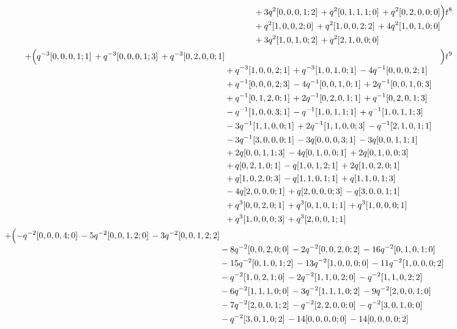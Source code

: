 \documentclass[10pt]{article}
\begin{document}
\[\begin{aligned}
\begin{aligned}[t]
  &{}+3q^{2}[0,0,0,1;2]\,+q^{2}[0,1,1,1;0]\,+q^{2}[0,2,0,0;0] \\
  &{}+q^{2}[1,0,0,2;0]\,+q^{2}[1,0,0,2;2]\,+4q^{2}[1,0,1,0;0] \\
  &{}+3q^{2}[1,0,1,0;2]\,+q^{2}[2,1,0,0;0]\end{aligned}\Bigr)t^{8} \\
  + \Bigl(\begin{aligned}[t]q^{-3}[0,0,0,1;1]\,+q^{-3}[0,0,0,1;3]\,+q^{-3}[0,2,0,0;1] \\
  &{}+q^{-3}[1,0,0,2;1]\,+q^{-3}[1,0,1,0;1]\,-4q^{-1}[0,0,0,2;1] \\
  &{}+q^{-1}[0,0,0,2;3]\,-4q^{-1}[0,0,1,0;1]\,+2q^{-1}[0,0,1,0;3] \\
  &{}+q^{-1}[0,1,2,0;1]\,+2q^{-1}[0,2,0,1;1]\,+q^{-1}[0,2,0,1;3] \\
  &{}-q^{-1}[1,0,0,3;1]\,-q^{-1}[1,0,1,1;1]\,+q^{-1}[1,0,1,1;3] \\
  &{}-3q^{-1}[1,1,0,0;1]\,+2q^{-1}[1,1,0,0;3]\,-q^{-1}[2,1,0,1;1] \\
  &{}-3q^{-1}[3,0,0,0;1]\,-3q[0,0,0,3;1]\,-3q[0,0,1,1;1] \\
  &{}+2q[0,0,1,1;3]\,-4q[0,1,0,0;1]\,+2q[0,1,0,0;3] \\
  &{}+q[0,2,1,0;1]\,-q[1,0,1,2;1]\,+2q[1,0,2,0;1] \\
  &{}+q[1,0,2,0;3]\,-q[1,1,0,1;1]\,+q[1,1,0,1;3] \\
  &{}-4q[2,0,0,0;1]\,+q[2,0,0,0;3]\,-q[3,0,0,1;1] \\
  &{}+q^{3}[0,0,2,0;1]\,+q^{3}[0,1,0,1;1]\,+q^{3}[1,0,0,0;1] \\
  &{}+q^{3}[1,0,0,0;3]\,+q^{3}[2,0,0,1;1]\end{aligned}\Bigr)t^{9} \\
  + \Bigl(\begin{aligned}[t]-q^{-2}[0,0,0,4;0]\,-5q^{-2}[0,0,1,2;0]\,-3q^{-2}[0,0,1,2;2] \\
  &{}-8q^{-2}[0,0,2,0;0]\,-2q^{-2}[0,0,2,0;2]\,-16q^{-2}[0,1,0,1;0] \\
  &{}-15q^{-2}[0,1,0,1;2]\,-13q^{-2}[1,0,0,0;0]\,-11q^{-2}[1,0,0,0;2] \\
  &{}-q^{-2}[1,0,2,1;0]\,-2q^{-2}[1,1,0,2;0]\,-q^{-2}[1,1,0,2;2] \\
  &{}-6q^{-2}[1,1,1,0;0]\,-3q^{-2}[1,1,1,0;2]\,-9q^{-2}[2,0,0,1;0] \\
  &{}-7q^{-2}[2,0,0,1;2]\,-q^{-2}[2,2,0,0;0]\,-q^{-2}[3,0,1,0;0] \\
  &{}-q^{-2}[3,0,1,0;2]\,-14[0,0,0,0;0]\,-14[0,0,0,0;2] \\

\end{aligned}
\end{aligned}\]
\end{document}
